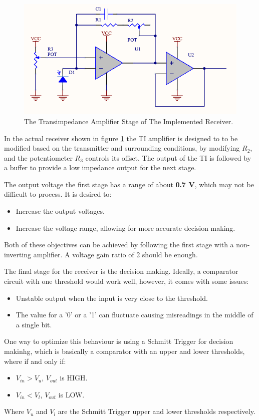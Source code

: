 \begin{figure}[h!]
	\centering
	\includegraphics[scale=0.6]{Figures/HW/ti-amp-buffer.png}
	\caption{The Transimpedance Amplifier Stage of The Implemented Receiver.}
	\label{fig:hw-ti-buffer}
\end{figure}


In the actual receiver shown in figure \ref{fig:hw-ti-buffer} the TI amplifier is designed to to be modified based on the transmitter and surrounding conditions, by modifying $R_2$, and the potentiometer $R_3$ controls its offset. The output of the TI is followed by a buffer to provide a low impedance output for the next stage. \cite{op-amp-circuits} 

The output voltage the first stage has a range of about \textbf{0.7 V}, which may not be difficult to process. It is desired to: 
\begin{itemize}
	\item Increase the output voltages.
	\item Increase the voltage range, allowing for more accurate decision making. 
\end{itemize}
Both of these objectives can be achieved by following the first stage with a non-inverting amplifier. A voltage gain ratio of 2 should be enough.

The final stage for the receiver is the decision making. Ideally, a comparator circuit with one threshold would work well, however, it comes with some issues:
\begin{itemize}
	\item Unstable output when the input is very close to the threshold.
	\item The value for a '0' or a '1' can fluctuate causing misreadings in the middle of a single bit.
\end{itemize}

One way to optimize this behaviour is using a Schmitt Trigger for decision makinhg, which is basically a comparator with an upper and lower thresholds, where if and only if:
\begin{itemize}
	\item $V_{in} > V_u$, $V_{out}$ is HIGH. 
	\item $V_{in} < V_l$, $V_{out}$ is LOW. 
\end{itemize}
Where $V_u$ and $V_l$ are the Schmitt Trigger upper and lower thresholds respectively.

